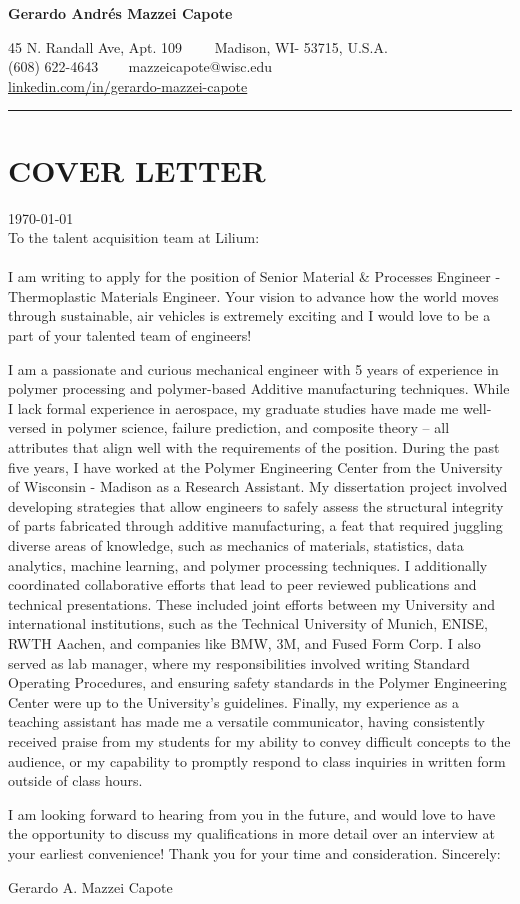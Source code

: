 \documentclass[12pt,letterpaper]{article}
\begin{document}
\begin{center}
	{\LARGE \textbf{Gerardo Andrés Mazzei Capote}}

	45 N. Randall Ave, Apt. 109\ \ \textbullet
	\ \ Madison, WI- 53715, U.S.A.
	\\
	(608) 622-4643 \ \textbullet
	\ \ mazzeicapote@wisc.edu\\
	\href{https://www.linkedin.com/in/gerardo-mazzei-capote}{linkedin.com/in/gerardo-mazzei-capote}
	
\end{center}
\vspace{-0.5em}
\hrule
\vspace{0.4em}
\vspace{-1em}

\section*{COVER LETTER}
\vspace{0.4em}
\today
\\
To the talent acquisition team at Lilium:
\\
\\
\indent I am writing to apply for the position of Senior Material \& Processes Engineer - Thermoplastic Materials Engineer. Your vision to advance how the world moves through sustainable, air vehicles is extremely exciting and I would love to be a part of your talented team of engineers!

I am a passionate and curious mechanical engineer with 5 years of experience in polymer processing and polymer-based Additive manufacturing techniques. While I lack formal experience in aerospace, my graduate studies have made me well-versed in polymer science, failure prediction, and composite theory -- all attributes that align well with the requirements of the position. During the past five years, I have worked at the Polymer Engineering Center from the University of Wisconsin - Madison as a Research Assistant. My dissertation project involved developing strategies that allow engineers to safely assess the structural integrity of parts fabricated through additive manufacturing, a feat that required juggling diverse areas of knowledge, such as mechanics of materials, statistics, data analytics, machine learning, and polymer processing techniques. I additionally coordinated collaborative efforts that lead to peer reviewed publications and technical presentations. These included joint efforts between my University and international institutions, such as the Technical University of Munich, ENISE, RWTH Aachen, and companies like BMW, 3M, and Fused Form Corp. I also served as lab manager, where my responsibilities involved writing Standard Operating Procedures, and ensuring safety standards in the Polymer Engineering Center were up to the University's guidelines. Finally, my experience as a teaching assistant has made me a versatile communicator, having consistently received praise from my students for my ability to convey difficult concepts to the audience, or my capability to promptly respond to class inquiries in written form outside of class hours. 	 

I am looking forward to hearing from you in the future, and would love to have the opportunity to discuss my qualifications in more detail over an interview at your earliest convenience! Thank you for your time and consideration. 
Sincerely: 
\\
\begin{center}
Gerardo A. Mazzei Capote
\end{center}
\end{document}
